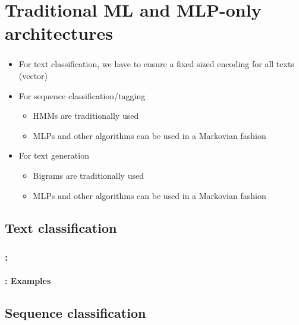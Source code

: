 \documentclass[xcolor=table]{beamer}
\begin{document}
\section{Traditional ML and MLP-only architectures}

\begin{frame}
	\frametitle{\insertshortsubtitle}
	\framesubtitle{\insertsection}
	
	\begin{itemize}
		\item For text classification, we have to ensure a fixed sized encoding for all texts (vector)
		\item For sequence classification/tagging
		\begin{itemize}
			\item HMMs are traditionally used
			\item MLPs and other algorithms can be used in a Markovian fashion 
		\end{itemize}
		\item For text generation
		\begin{itemize}
			\item Bigrams are traditionally used
			\item MLPs and other algorithms can be used in a Markovian fashion 
		\end{itemize}
	\end{itemize}
	
\end{frame}


\subsection{Text classification}

\begin{frame}
	\frametitle{\insertshortsubtitle: \insertsection}
	\framesubtitle{\insertsubsection: Examples}
	
	
\end{frame}

\subsection{Sequence classification}
\end{document}
